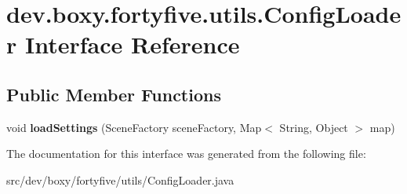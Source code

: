 \hypertarget{interfacedev_1_1boxy_1_1fortyfive_1_1utils_1_1_config_loader}{
\section{dev.boxy.fortyfive.utils.ConfigLoader Interface Reference}
\label{d9/dbc/interfacedev_1_1boxy_1_1fortyfive_1_1utils_1_1_config_loader}
}
\subsection*{Public Member Functions}
\begin{DoxyCompactItemize}
\item 
\hypertarget{interfacedev_1_1boxy_1_1fortyfive_1_1utils_1_1_config_loader_ade323fef27fdcd40ea733683326b2039}{
void {\bfseries loadSettings} (SceneFactory sceneFactory, Map$<$ String, Object $>$ map)}
\label{d9/dbc/interfacedev_1_1boxy_1_1fortyfive_1_1utils_1_1_config_loader_ade323fef27fdcd40ea733683326b2039}

\end{DoxyCompactItemize}


The documentation for this interface was generated from the following file:\begin{DoxyCompactItemize}
\item 
src/dev/boxy/fortyfive/utils/ConfigLoader.java\end{DoxyCompactItemize}
